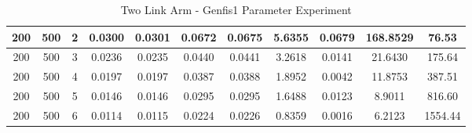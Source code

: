\documentclass[11.5pt, twoside, a4paper]{article}
\begin{document}
\begin{table}
{\begin{tabular}{|c | c | c | c | c | c | c | c | c | c  | c | }
200 &	500 &	2 &	0.0300 &	0.0301 &	0.0672 &	0.0675 &	5.6355 &	0.0679 &	168.8529 &		76.53 \\ \hline
200 &	500 &	3 &	0.0236 &	0.0235 &	0.0440 &	0.0441 &	3.2618 &	0.0141 &	21.6430 &		175.64 \\ \hline
200 &	500 &	4 &	0.0197 &	0.0197 &	0.0387 &	0.0388 &	1.8952 &	0.0042 &	11.8753 &		387.51 \\ \hline
200 &	500 &	5 &	0.0146 &	0.0146 &	0.0295 &	0.0295 &	1.6488 &	0.0123 &	8.9011 &		816.60 \\ \hline
200 &	500 &	6 &	0.0114 &	0.0115 &	0.0224 &	0.0226 &	0.8359 &	0.0016 &	6.2123 &		1554.44 \\ \hline
\end{tabular}}
\caption{Two Link Arm - Genfis1 Parameter Experiment \label{tab:2LinkGenfis1}}
\end{table}




{}
\end{document}
